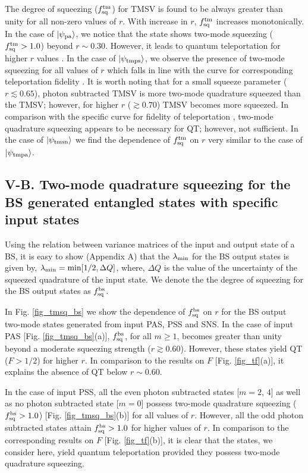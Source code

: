 \documentclass[letter,scriptaddress,twocolumn, prl,showkeys]{revtex4}
\begin{document}
The degree of squeezing ($f_{\rm{sq}}^{\rm{tm}}$) for TMSV is found to be always greater than unity for all non-zero values of $r$. With increase in $r$, $f_{\rm{sq}}^{\rm{tm}}$ increases monotonically.
In the case of $|\psi_{\rm{pa}}\rangle$, we notice that the state shows two-mode squeezing ($f_{\rm{sq}}^{\rm{tm}}>1.0$) beyond $r\sim 0.30$. 
However, it leads to quantum teleportation for higher $r$ values \cite{tp_illuminati}.
In the case of $|\psi_{\rm{tmps}}\rangle$, we observe the presence of two-mode squeezing for all values of $r$ which falls in line with the curve for corresponding teleportation fidelity \cite{tp_illuminati}. 
It is worth noting that for a small squeeze parameter ($r\lesssim 0.65$), photon subtracted TMSV is more two-mode quadrature squeezed than the TMSV; however, for higher $r$ ($\gtrsim 0.70$) TMSV becomes more squeezed. 
In comparison with the specific curve for fidelity of teleportation \cite{tp_illuminati}, two-mode quadrature squeezing appears to be necessary for QT; however, not sufficient. 
In the case of $|\psi_{\rm{tmsn}}\rangle$ we find the dependence of $f_{\rm{sq}}^{\rm{tm}}$ on $r$ very similar to the case of $|\psi_{\rm{tmpa}}\rangle$.

\subsection*{V-B. Two-mode quadrature squeezing for the BS generated entangled states with specific input states}

Using the relation between variance matrices of the input and output state of a BS, it is easy to show (Appendix A) that the $\lambda_{\rm{min}}$ for the BS output states is given by, $\lambda_{\rm{min}}=\min [1/2,\Delta Q]$, where, $\Delta Q$ is the value of the uncertainty of the squeezed quadrature of the input state. We denote the the degree of squeezing for the BS output states as $f_{\rm{sq}}^{\rm{bs}}$.

In Fig. \ref{fig_tmsq_bs} we show the dependence of $f_{\rm{sq}}^{\rm{bs}}$ on $r$ for the BS output two-mode states generated from input PAS, PSS and SNS. 
In the case of input PAS [Fig. \ref{fig_tmsq_bs}(a)], $f_{\rm{sq}}^{\rm{bs}}$, for all $m\geq 1$, becomes greater than unity beyond a moderate squeezing strength ($r\gtrsim 0.60$). 
However, these states yield QT ($F>1/2$) for higher $r$.
In comparison to the results on $F$ [Fig. \ref{fig_tf}(a)], it explains the absence of QT below $r\sim 0.60$. 

In the case of input PSS, all the even photon subtracted states [$m=2$, $4$] as well as no photon subtracted state [$m=0$] possess two-mode quadrature squeezing ($f_{\rm{sq}}^{\rm{bs}}>1.0$) [Fig. \ref{fig_tmsq_bs}(b)] for all values of $r$. However, all the odd photon subtracted states attain $f_{\rm{sq}}^{\rm{bs}}>1.0$ for higher values of $r$.  
In comparison to the corresponding results on $F$ [Fig. \ref{fig_tf}(b)], it is clear that the states, we consider here, yield quantum teleportation provided they possess two-mode quadrature squeezing.
\end{document}
